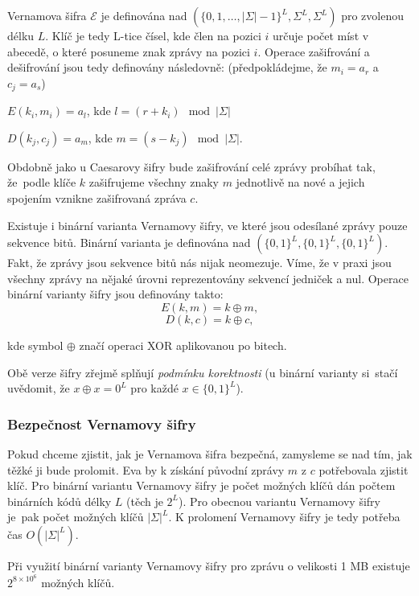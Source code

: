 \documentclass[
  program=infoi,
  biblatex=false,
  figures=true,
  glossaries,
  tables=false,
  sourcecodes=true,
  index
]{kidiplom}
\begin{document}
    Vernamova šifra $\mathcal{E}$ je definována nad $(\{0, 1, \ldots, |\Sigma|-1\}^L, \Sigma^L, \Sigma^L)$ pro zvolenou délku $L$.
    Klíč je tedy L-tice čísel, kde člen na pozici $i$ určuje počet míst v abecedě, o které posuneme znak zprávy na pozici $i$.
    Operace zašifrování a dešifrování jsou tedy definovány následovně:
    (předpokládejme, že $m_i = a_r$ a $c_j = a_s$)

    \begin{center}
        $E(k_i, m_i) = a_l$, kde $l = (r+k_i)\mod{|\Sigma|}$

        $D(k_j, c_j) = a_m$, kde $m = (s-k_j)\mod{|\Sigma|}$.
    \end{center}

    Obdobně jako u Caesarovy šifry bude zašifrování celé zprávy probíhat tak, že~podle klíče $k$ zašifrujeme všechny znaky $m$ jednotlivě na nové a
    jejich spojením vznikne zašifrovaná zpráva $c$.

    Existuje i binární varianta Vernamovy šifry, ve které jsou odesílané zprávy pouze sekvence bitů.
    Binární varianta je definována nad $(\{0,1\}^L, \{0,1\}^L, \{0,1\}^L)$.
    Fakt, že zprávy jsou sekvence bitů nás nijak neomezuje. Víme, že v praxi jsou všechny zprávy na nějaké úrovni
    reprezentovány sekvencí jedniček a nul.
    Operace binární varianty šifry jsou definovány takto:
    \[
        E(k, m) = k \oplus m,
    \]
    \[
        D(k, c) = k \oplus c,
    \]

    \noindent
    kde symbol $\oplus$ značí operaci XOR aplikovanou po bitech.

    Obě verze šifry zřejmě splňují \emph{podmínku korektnosti}
    (u binární varianty si~stačí uvědomit, že $x \oplus x = 0^L$ pro každé $x \in \{0,1\}^L$).


    \subsubsection{Bezpečnost Vernamovy šifry}

        Pokud chceme zjistit, jak je Vernamova šifra bezpečná, zamysleme se nad tím, jak těžké ji bude prolomit.
        Eva by k získání původní zprávy $m$ z $c$ potřebovala zjistit klíč.
        Pro binární variantu Vernamovy šifry je počet možných klíčů dán počtem binárních kódů délky $L$ (těch je $2^L$).
        Pro obecnou variantu Vernamovy šifry je~pak počet možných klíčů $|\Sigma|^L$.
        K prolomení Vernamovy šifry je tedy potřeba čas $O(|\Sigma|^L)$.

        \begin{example}
            Při využití binární varianty Vernamovy šifry pro zprávu o velikosti 1 MB existuje $2^{8 \times 10^6}$ možných klíčů.
        \end{example}
\end{document}
